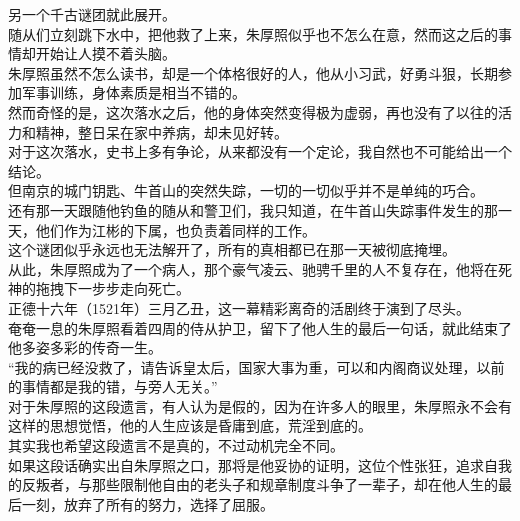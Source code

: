 \begin{multicols}{\theparacolNo}
另一个千古谜团就此展开。\\

随从们立刻跳下水中，把他救了上来，朱厚照似乎也不怎么在意，然而这之后的事情却开始让人摸不着头脑。\\

朱厚照虽然不怎么读书，却是一个体格很好的人，他从小习武，好勇斗狠，长期参加军事训练，身体素质是相当不错的。\\

然而奇怪的是，这次落水之后，他的身体突然变得极为虚弱，再也没有了以往的活力和精神，整日呆在家中养病，却未见好转。\\

对于这次落水，史书上多有争论，从来都没有一个定论，我自然也不可能给出一个结论。\\

但南京的城门钥匙、牛首山的突然失踪，一切的一切似乎并不是单纯的巧合。\\

还有那一天跟随他钓鱼的随从和警卫们，我只知道，在牛首山失踪事件发生的那一天，他们作为江彬的下属，也负责着同样的工作。\\

这个谜团似乎永远也无法解开了，所有的真相都已在那一天被彻底掩埋。\\

从此，朱厚照成为了一个病人，那个豪气凌云、驰骋千里的人不复存在，他将在死神的拖拽下一步步走向死亡。\\

正德十六年（1521年）三月乙丑，这一幕精彩离奇的活剧终于演到了尽头。\\

奄奄一息的朱厚照看着四周的侍从护卫，留下了他人生的最后一句话，就此结束了他多姿多彩的传奇一生。\\

“我的病已经没救了，请告诉皇太后，国家大事为重，可以和内阁商议处理，以前的事情都是我的错，与旁人无关。”\\

对于朱厚照的这段遗言，有人认为是假的，因为在许多人的眼里，朱厚照永不会有这样的思想觉悟，他的人生应该是昏庸到底，荒淫到底的。\\

其实我也希望这段遗言不是真的，不过动机完全不同。\\

如果这段话确实出自朱厚照之口，那将是他妥协的证明，这位个性张狂，追求自我的反叛者，与那些限制他自由的老头子和规章制度斗争了一辈子，却在他人生的最后一刻，放弃了所有的努力，选择了屈服。\\


\end{multicols}
